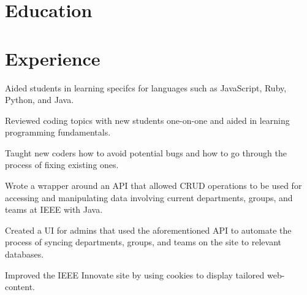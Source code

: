 \documentclass[]{deedy-resume-openfont}
\begin{document}
%
%




\section{Education}

\vspace{1mm}

\sectionsep


\section{Experience}

\vspace{1mm}

\vspace{1mm}
\begin{tightemize} \itemsep 7pt
\item Aided students in learning specifcs for languages such as JavaScript, Ruby, Python, and Java.
\item Reviewed coding topics with new students one-on-one and aided in learning programming fundamentals.
\item Taught new coders how to avoid potential bugs and how to go through the process of fixing existing ones.
\end{tightemize}
\sectionsep

\vspace{1mm}
\begin{tightemize} \itemsep 7pt
\item Wrote a wrapper around an API that allowed CRUD operations to be used for accessing and manipulating data involving current departments, groups, and teams at IEEE with Java.
\item Created a UI for admins that used the aforementioned API to automate the
process of syncing departments, groups, and teams on the site to relevant databases.
\item Improved the IEEE Innovate site by using cookies to display tailored web-content.
\end{tightemize}
\sectionsep
\end{document}
